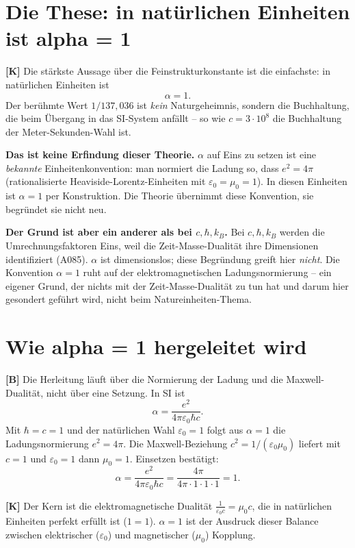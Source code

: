 \section{Die These: in natürlichen Einheiten ist alpha = 1}

\textbf{[K]} Die stärkste Aussage über die Feinstrukturkonstante ist die
einfachste: in natürlichen Einheiten ist
\[
  \alpha = 1 .
\]
Der berühmte Wert $1/137{,}036$ ist \emph{kein} Naturgeheimnis, sondern die
Buchhaltung, die beim Übergang in das SI-System anfällt -- so wie
$c = 3\cdot10^8$ die Buchhaltung der Meter-Sekunden-Wahl ist.

\textbf{Das ist keine Erfindung dieser Theorie.} $\alpha$ auf Eins zu setzen ist
eine \emph{bekannte} Einheitenkonvention: man normiert die Ladung so, dass
$e^2 = 4\pi$ (rationalisierte Heaviside-Lorentz-Einheiten mit
$\varepsilon_0 = \mu_0 = 1$). In diesen Einheiten ist $\alpha = 1$ per
Konstruktion. Die Theorie übernimmt diese Konvention, sie begründet sie nicht neu.

\textbf{Der Grund ist aber ein anderer als bei $c, \hbar, k_B$.} Bei
$c, \hbar, k_B$ werden die
Umrechnungsfaktoren Eins, weil die Zeit-Masse-Dualität ihre Dimensionen
identifiziert (A085). $\alpha$ ist dimensionslos; diese Begründung greift hier
\emph{nicht}. Die Konvention $\alpha = 1$ ruht auf der elektromagnetischen
Ladungsnormierung -- ein eigener Grund, der nichts mit der Zeit-Masse-Dualität
zu tun hat und darum hier gesondert geführt wird, nicht beim Natureinheiten-Thema.

\section{Wie alpha = 1 hergeleitet wird}

\textbf{[B]} Die Herleitung läuft über die Normierung der Ladung und die
Maxwell-Dualität, nicht über eine Setzung. In SI ist
\[
  \alpha = \frac{e^2}{4\pi\varepsilon_0\hbar c}.
\]
Mit $\hbar = c = 1$ und der natürlichen Wahl $\varepsilon_0 = 1$ folgt aus
$\alpha = 1$ die Ladungsnormierung $e^2 = 4\pi$. Die Maxwell-Beziehung
$c^2 = 1/(\varepsilon_0\mu_0)$ liefert mit $c = 1$ und $\varepsilon_0 = 1$ dann
$\mu_0 = 1$. Einsetzen bestätigt:
\[
  \alpha = \frac{e^2}{4\pi\varepsilon_0\hbar c} = \frac{4\pi}{4\pi\cdot1\cdot1\cdot1} = 1 .
\]

\textbf{[K]} Der Kern ist die elektromagnetische Dualität
$\tfrac{1}{\varepsilon_0 c} = \mu_0 c$, die in natürlichen Einheiten perfekt
erfüllt ist ($1 = 1$). $\alpha = 1$ ist der Ausdruck dieser Balance zwischen
elektrischer ($\varepsilon_0$) und magnetischer ($\mu_0$) Kopplung.

